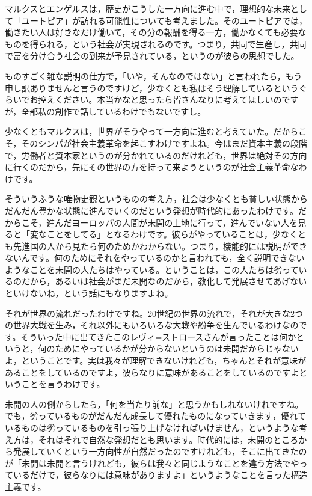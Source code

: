 \documentclass{ltjsbook}
\begin{document}
マルクスとエンゲルスは，歴史がこうした一方向に進む中で，理想的な未来として「ユートピア」が訪れる可能性についても考えました。そのユートピアでは，働きたい人は好きなだけ働いて，その分の報酬を得る一方，働かなくても必要なものを得られる，という社会が実現されるのです。つまり，共同で生産し，共同で富を分け合う社会の到来が予見されている，というのが彼らの思想でした。

ものすごく雑な説明の仕方で，「いや，そんなのではない」と言われたら，もう申し訳ありませんと言うのですけど，少なくとも私はそう理解しているというぐらいでお控えください。本当かなと思ったら皆さんなりに考えてほしいのですが，全部私の創作で話しているわけでもないですし。

少なくともマルクスは，世界がそうやって一方向に進むと考えていた。だからこそ，そのシンパが社会主義革命を起こすわけですよね。今はまだ資本主義の段階で，労働者と資本家というのが分かれているのだけれども，世界は絶対その方向に行くのだから，先にその世界の方を持って来ようというのが社会主義革命なわけです。

そういうふうな唯物史観というものの考え方，社会は少なくとも貧しい状態からだんだん豊かな状態に進んでいくのだという発想が時代的にあったわけです。だからこそ，進んだヨーロッパの人間が未開の土地に行って，進んでいない人を見ると「変なことをしてる」となるわけです。彼らがやっていることは，少なくとも先進国の人から見たら何のためかわからない。つまり，機能的には説明ができないんです。何のためにそれをやっているのかと言われても，全く説明できないようなことを未開の人たちはやっている。ということは，この人たちは劣っているのだから，あるいは社会がまだ未開なのだから，教化して発展させてあげないといけないね，という話にもなりますよね。

それが世界の流れだったわけですね。20世紀の世界の流れで，それが大きな2つの世界大戦を生み，それ以外にもいろいろな大戦や紛争を生んでいるわけなのです。そういった中に出てきたこのレヴィ=ストロースさんが言ったことは何かというと，何のためにやっているかが分からないというのは未開だからじゃないよ，ということです。実は我々が理解できないけれども，ちゃんとそれが意味があることをしているのですよ，彼らなりに意味があることをしているのですよということを言うわけです。

未開の人の側からしたら，「何を当たり前な」と思うかもしれないけれですね。でも，劣っているものがだんだん成長して優れたものになっていきます，優れているものは劣っているものを引っ張り上げなければいけません，というような考え方は，それはそれで自然な発想だとも思います。時代的には，未開のところから発展していくという一方向性が自然だったのですけれども，そこに出てきたのが「未開は未開と言うけれども，彼らは我々と同じようなことを違う方法でやっているだけで，彼らなりには意味がありますよ」というようなことを言った構造主義です。
\end{document}
